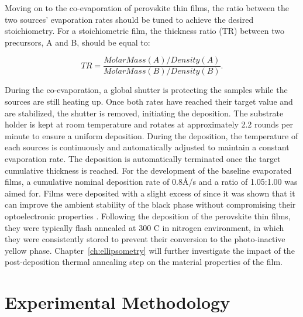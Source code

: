 Moving on to the co-evaporation of perovskite thin films, the ratio between the two sources' evaporation rates should be tuned to achieve the desired stoichiometry. For a stoichiometric film, the thickness ratio (TR) between two precursors, A and B, should be equal to: 

\begin{equation}
    TR = \frac{MolarMass(A)/Density(A)}{MolarMass(B)/Density(B)}.
\end{equation}

During the co-evaporation, a global shutter is protecting the samples while the sources are still heating up. Once both rates have reached their target value and are stabilized, the shutter is removed, initiating the deposition. The substrate holder is kept at room temperature and rotates at approximately 2.2 rounds per minute to ensure a uniform deposition. During the deposition, the temperature of each sources is continuously and automatically adjusted to maintain a constant evaporation rate. The deposition is automatically terminated once the target cumulative thickness is reached. For the development of the baseline evaporated films, a cumulative nominal deposition rate of 0.8{\AA}/s and a  ratio of 1.05:1.00 was aimed for. Films were deposited with a slight excess of  since it was shown that it can improve the ambient stability of the black phase without compromising their optoelectronic properties \cite{Ma2017TheCells}. Following the deposition of the perovskite thin films, they were typically flash annealed at 300 \degree C in nitrogen environment, in which they were consistently stored to prevent their conversion to the photo-inactive yellow phase. Chapter~\ref{ch:ellipsometry} will further investigate the impact of the post-deposition thermal annealing step on the material properties of the  film.


\section{Experimental Methodology}

